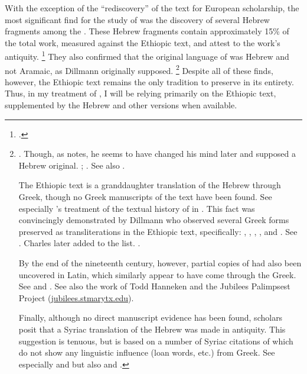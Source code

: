 With the exception of the ``rediscovery'' of the text for European scholarship, the most significant find for the study of \jub was the discovery of several Hebrew fragments among the \dss. These Hebrew fragments contain approximately 15\% of the total work, measured against the Ethiopic text, and attest to the work's antiquity.%
    \footnote{%
        \Cite[124]{stokl_henoch2006}.}
They also confirmed that the original language of \jub was Hebrew and not Aramaic, as Dillmann originally supposed.%
        \footnote{%
            \Cite[90]{dillamnn_jbw1850}. Though, as \vanderkam notes, he seems to have changed his mind later and supposed a Hebrew original. 
            \cite[324]{dillmann_spaw1883}; 
            \cite[1:1 n. 1]{vanderkam2018}. See also 
            \cite{weitzman_jaos1999}.

        The Ethiopic text is a granddaughter translation of the Hebrew through Greek, though no Greek manuscripts of the text have been found. See especially \vanderkam's treatment of the textual history of \jub in 
        \cite*[1--18]{vanderkam1977}. This fact was convincingly demonstrated by Dillmann who observed several Greek forms preserved as transliterations in the Ethiopic text, specifically: , , , , and . See 
        \cite[88]{dillamnn_jbw1850}. Charles later added  to the list. 
        \cite[xxx]{charles1902}.

        By the end of the nineteenth century, however, partial copies of \jub had also been uncovered in Latin, which similarly appear to have come through the Greek.
        See
                \cite[15--54]{ceriani1861} and
                \cite{ronsch1874}.
        See also the work of Todd Hanneken and the Jubilees Palimpsest Project (\href{http://jubilees.stmarytx.edu}{jubilees.stmarytx.edu}).

        Finally, although no direct manuscript evidence has been found, \jub scholars posit that a Syriac translation of the Hebrew was made in antiquity. This suggestion is tenuous, but is based on a number of Syriac citations of \jub which do not show any linguistic influence (loan words, etc.) from Greek.
        See especially
                \cite[231--232]{tisserant_rb1921} and 
                \cite[xxix]{charles1902} but also 
                \cite[2:ix--x]{ceriani1861} and 
                \cite[x]{charles1895}.}
Despite all of these finds, however, the Ethiopic text remains the only tradition to preserve \jub in its entirety. Thus, in my treatment of \jub, I will be relying primarily on the Ethiopic text, supplemented by the Hebrew and other versions when available.

